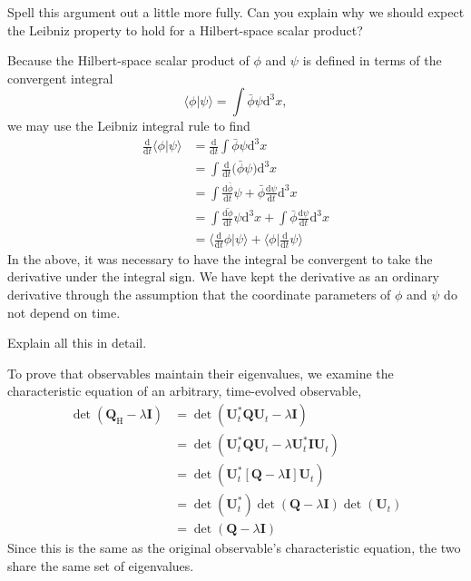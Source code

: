 \documentclass[../road-to-reality.tex]{subfiles}
\begin{document}
\begin{questions}
\question Spell this argument out a little more fully. Can you explain why we should expect the Leibniz property to hold for a Hilbert-space scalar product?

\begin{solution}
	Because the Hilbert-space scalar product of $\phi$ and $\psi$ is defined in terms of the convergent integral
	\[
		\langle\phi|\psi\rangle = \int\bar{\phi}\psi\mathrm{d}^3x,
	\]
	we may use the Leibniz integral rule to find
	\begin{align*}
		\frac{\mathrm{d}}{\mathrm{d}t}\langle\phi|\psi\rangle &= \frac{\mathrm{d}}{\mathrm{d}t}\int\bar{\phi}\psi\mathrm{d}^3x \\
		&= \int \frac{\mathrm{d}}{\mathrm{d}t}\Big(\bar{\phi}\psi\Big)\mathrm{d}^3x \\
		&= \int \frac{\mathrm{d}\bar{\phi}}{\mathrm{d}t}\psi + \bar{\phi}\frac{\mathrm{d}\psi}{\mathrm{d}t}\mathrm{d}^3x \\
		&= \int\overline{\frac{\mathrm{d}\phi}{\mathrm{d}t}}\psi\mathrm{d}^3x + \int\bar{\phi}\frac{\mathrm{d}\psi}{\mathrm{d}t}\mathrm{d}^3x \\
		&= \Big\langle\frac{\mathrm{d}}{\mathrm{d}t}\phi\Big|\psi\Big\rangle + \Big\langle\phi\Big|\frac{\mathrm{d}}{\mathrm{d}t}\psi\Big\rangle
	\end{align*}
	In the above, it was necessary to have the integral be convergent to take the derivative under the integral sign. We have kept the derivative as an ordinary derivative through the assumption that the coordinate parameters of $\phi$ and $\psi$ do not depend on time.
\end{solution}

\question Explain all this in detail.

\begin{solution}
	To prove that observables maintain their eigenvalues, we examine the characteristic equation of an arbitrary, time-evolved observable,
	\begin{align*}
		\det(\mathbf{Q}_{\mathrm{H}} - \lambda\mathbf{I}) &= \det(\mathbf{U}_t^*\mathbf{Q}\mathbf{U}_t - \lambda\mathbf{I}) \\
		&= \det(\mathbf{U}_t^*\mathbf{Q}\mathbf{U}_t - \lambda\mathbf{U}_t^*\mathbf{I}\mathbf{U}_t) \\
		&= \det(\mathbf{U}_t^*[\mathbf{Q}-\lambda\mathbf{I}]\mathbf{U}_t) \\
		&= \det(\mathbf{U}_t^*)\det(\mathbf{Q}-\lambda\mathbf{I})\det(\mathbf{U}_t) \\
		&= \det(\mathbf{Q}-\lambda\mathbf{I})
	\end{align*}
	Since this is the same as the original observable's characteristic equation, the two share the same set of eigenvalues.
	

\end{solution}
\end{questions}
\end{document}

